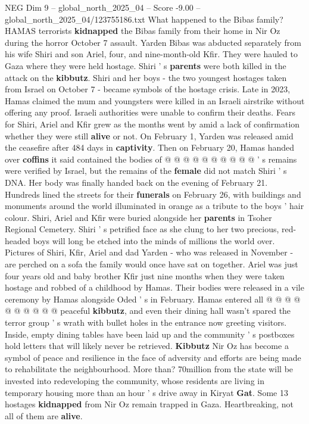 \begin{textsample}{NEG Dim 9 – global\_north\_2025\_04 – Score -9.00 – global\_north\_2025\_04/123755186.txt}  \label{ex:f9_neg_122}
What happened to the Bibas family?
HAMAS terrorists \textbf{kidnapped} the Bibas family from their home in Nir Oz during the horror October 7 assault.
Yarden Bibas was abducted separately from his wife Shiri and son Ariel, four, and nine-month-old Kfir.
They were hauled to Gaza where they were held hostage.
Shiri ' s \textbf{parents} were both killed in the attack on the \textbf{kibbutz}.
Shiri and her boys - the two youngest hostages taken from Israel on October 7 - became symbols of the hostage crisis.
Late in 2023, Hamas claimed the mum and youngsters were killed in an Israeli airstrike without offering any proof.
Israeli authorities were unable to confirm their deaths.
Fears for Shiri, Ariel and Kfir grew as the months went by amid a lack of confirmation whether they were still \textbf{alive} or not.
On February 1, Yarden was released amid the ceasefire after 484 days in \textbf{captivity}.
Then on February 20, Hamas handed over \textbf{coffins} it said contained the bodies of @ @ @ @ @ @ @ @ @ @ ' s remains were verified by Israel, but the remains of the \textbf{female} did not match Shiri ' s DNA.
Her body was finally handed back on the evening of February 21.
Hundreds lined the streets for their \textbf{funerals} on February 26, with buildings and monuments around the world illuminated in orange as a tribute to the boys ' hair colour.
Shiri, Ariel and Kfir were buried alongside her \textbf{parents} in Tsoher Regional Cemetery.
Shiri ' s petrified face as she clung to her two precious, red-headed boys will long be etched into the minds of millions the world over.
Pictures of Shiri, Kfir, Ariel and dad Yarden - who was released in November - are perched on a sofa the family would once have sat on together.
Ariel was just four years old and baby brother Kfir just nine months when they were taken hostage and robbed of a childhood by Hamas.
Their bodies were released in a vile ceremony by Hamas alongside Oded ' s in February.
Hamas entered all @ @ @ @ @ @ @ @ @ @ peaceful \textbf{kibbutz}, and even their dining hall wasn't spared the terror group ' s wrath with bullet holes in the entrance now greeting visitors.
Inside, empty dining tables have been laid up and the community ' s postboxes hold letters that will likely never be retrieved. \textbf{Kibbutz} Nir Oz has become a symbol of peace and resilience in the face of adversity and efforts are being made to rehabilitate the neighbourhood.
More than? 70million from the state will be invested into redeveloping the community, whose residents are living in temporary housing more than an hour ' s drive away in Kiryat \textbf{Gat}.
Some 13 hostages \textbf{kidnapped} from Nir Oz remain trapped in Gaza.
Heartbreaking, not all of them are \textbf{alive}.

\end{textsample}
